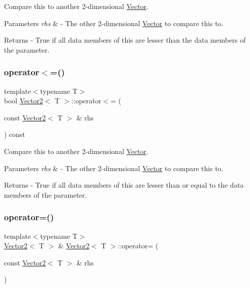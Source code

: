 Compare this to another 2-\/dimensional \mbox{\hyperlink{class_vector}{Vector}}. 
\begin{DoxyParams}{Parameters}
{\em rhs} & -\/ The other 2-\/dimensional \mbox{\hyperlink{class_vector}{Vector}} to compare this to. \\
\hline
\end{DoxyParams}
\begin{DoxyReturn}{Returns}
-\/ True if all data members of this are lesser than the data members of the parameter. 
\end{DoxyReturn}
\mbox{\label{class_vector2_a0a798a144b107a4a7964da13c1ada290}} 
\subsubsection{\texorpdfstring{operator$<$=()}{operator<=()}}
{\footnotesize\ttfamily template$<$typename T$>$ \\
bool \mbox{\hyperlink{class_vector2}{Vector2}}$<$ T $>$\+::operator$<$= (\begin{DoxyParamCaption}\item[{const \mbox{\hyperlink{class_vector2}{Vector2}}$<$ T $>$ \&}]{rhs }\end{DoxyParamCaption}) const}

Compare this to another 2-\/dimensional \mbox{\hyperlink{class_vector}{Vector}}. 
\begin{DoxyParams}{Parameters}
{\em rhs} & -\/ The other 2-\/dimensional \mbox{\hyperlink{class_vector}{Vector}} to compare this to. \\
\hline
\end{DoxyParams}
\begin{DoxyReturn}{Returns}
-\/ True if all data members of this are lesser than or equal to the data members of the parameter. 
\end{DoxyReturn}
\mbox{\label{class_vector2_ab8633853c2cb5c1d51610654bab61e79}} 
\subsubsection{\texorpdfstring{operator=()}{operator=()}}
{\footnotesize\ttfamily template$<$typename T$>$ \\
\mbox{\hyperlink{class_vector2}{Vector2}}$<$ T $>$ \& \mbox{\hyperlink{class_vector2}{Vector2}}$<$ T $>$\+::operator= (\begin{DoxyParamCaption}\item[{const \mbox{\hyperlink{class_vector2}{Vector2}}$<$ T $>$ \&}]{rhs }\end{DoxyParamCaption})}

